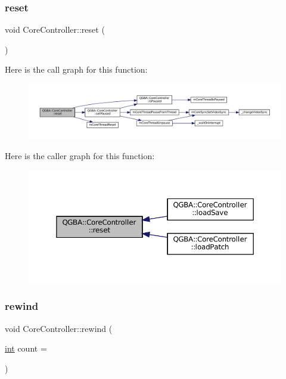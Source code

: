 \subsubsection{\texorpdfstring{reset}{reset}}
{\footnotesize\ttfamily void Core\+Controller\+::reset (\begin{DoxyParamCaption}{ }\end{DoxyParamCaption})\hspace{0.3cm}{\ttfamily [slot]}}

Here is the call graph for this function\+:
\nopagebreak
\begin{figure}[H]
\begin{center}
\leavevmode
\includegraphics[width=350pt]{class_q_g_b_a_1_1_core_controller_a6d73ddd320e162098eac86601f699cd7_cgraph}
\end{center}
\end{figure}
Here is the caller graph for this function\+:
\nopagebreak
\begin{figure}[H]
\begin{center}
\leavevmode
\includegraphics[width=350pt]{class_q_g_b_a_1_1_core_controller_a6d73ddd320e162098eac86601f699cd7_icgraph}
\end{center}
\end{figure}
\mbox{\label{class_q_g_b_a_1_1_core_controller_a411c359b4192d9e461cdb7bdf2cb71e3}} 
\subsubsection{\texorpdfstring{rewind}{rewind}}
{\footnotesize\ttfamily void Core\+Controller\+::rewind (\begin{DoxyParamCaption}\item[{\mbox{\hyperlink{ioapi_8h_a787fa3cf048117ba7123753c1e74fcd6}{int}}}]{count = {} }\end{DoxyParamCaption})\hspace{0.3cm}{\ttfamily [slot]}}

